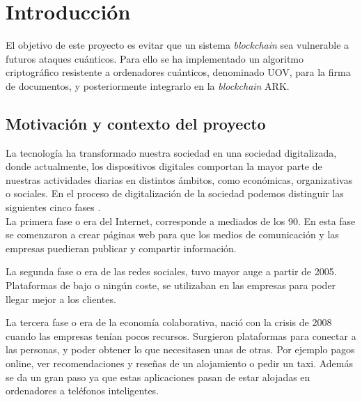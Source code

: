 \chapter{Introducción}

El objetivo de este proyecto es evitar que un sistema \textit{blockchain} sea vulnerable a futuros ataques cuánticos. Para ello se ha implementado un algoritmo criptográfico resistente a ordenadores cuánticos, denominado UOV, para la firma de documentos, y posteriormente integrarlo en la \textit{blockchain} ARK.

\section{Motivación y contexto del proyecto}
\label{sec:intro:motivacion} %


La tecnología ha transformado nuestra sociedad en una sociedad digitalizada, donde actualmente, los dispositivos digitales comportan la mayor parte de nuestras actividades diarias en distintos ámbitos, como económicas, organizativas o sociales. En el proceso de digitalización de la sociedad podemos distinguir las siguientes cinco fases \cite{fases-digitalizacion}.\\

La primera fase o era del Internet, corresponde a mediados de los 90. En esta fase se comenzaron a crear páginas web para que los medios de comunicación y las empresas puedieran publicar y compartir información.

La segunda fase o era de las redes sociales, tuvo mayor auge a partir de 2005. Plataformas de bajo o ningún coste, se utilizaban en las empresas para poder llegar mejor a los clientes.

La tercera fase o era de la economía colaborativa, nació con la crisis de  2008 cuando las empresas tenían pocos recursos. Surgieron plataformas para conectar a las personas, y poder obtener lo que necesitasen unas de otras. Por ejemplo pagos online, ver recomendaciones y reseñas de un alojamiento o pedir un taxi. Además se da un gran paso ya que estas aplicaciones pasan de estar  alojadas en ordenadores a teléfonos inteligentes.

